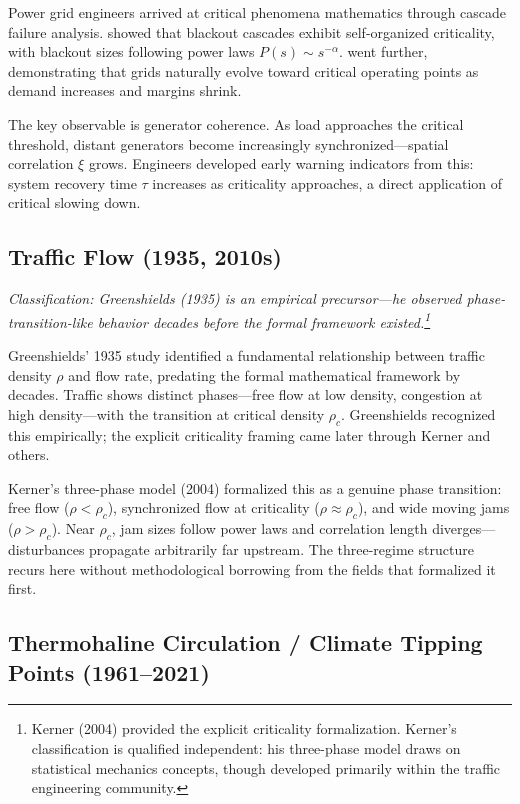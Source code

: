 \documentclass[11pt]{article}
\begin{document}
Power grid engineers arrived at critical phenomena mathematics through cascade failure analysis. \citet{crucitti2004} showed that blackout cascades exhibit self-organized criticality, with blackout sizes following power laws $P(s) \sim s^{-\alpha}$. \citet{dobson2007} went further, demonstrating that grids naturally evolve toward critical operating points as demand increases and margins shrink.

The key observable is generator coherence. As load approaches the critical threshold, distant generators become increasingly synchronized---spatial correlation $\xi$ grows. Engineers developed early warning indicators from this: system recovery time $\tau$ increases as criticality approaches, a direct application of critical slowing down.

\subsection{Traffic Flow (1935, 2010s)}

\noindent\textit{Classification: Greenshields (1935) is an empirical precursor---he observed phase-transition-like behavior decades before the formal framework existed.\footnote{Kerner (2004) provided the explicit criticality formalization. Kerner's classification is qualified independent: his three-phase model draws on statistical mechanics concepts, though developed primarily within the traffic engineering community.}}
\smallskip

Greenshields' 1935 study \citep{greenshields1935} identified a fundamental relationship between traffic density $\rho$ and flow rate, predating the formal mathematical framework by decades. Traffic shows distinct phases---free flow at low density, congestion at high density---with the transition at critical density $\rho_c$. Greenshields recognized this empirically; the explicit criticality framing came later through Kerner and others.

Kerner's three-phase model (2004) \citep{kerner2004} formalized this as a genuine phase transition: free flow ($\rho < \rho_c$), synchronized flow at criticality ($\rho \approx \rho_c$), and wide moving jams ($\rho > \rho_c$). Near $\rho_c$, jam sizes follow power laws and correlation length diverges---disturbances propagate arbitrarily far upstream. The three-regime structure recurs here without methodological borrowing from the fields that formalized it first.

\subsection{Thermohaline Circulation / Climate Tipping Points (1961--2021)}
\end{document}
